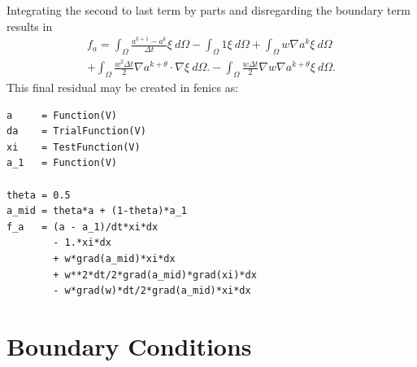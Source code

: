 \documentclass{article}%
\begin{document}
Integrating the second to last term by parts and disregarding the boundary term results in
\begin{align*}
  f_a = \int_{\Omega} \frac{a^{k+1} - a^{k}}{\Delta t}\xi\ d\Omega - 
      \int_{\Omega} 1\xi\ d\Omega
  + \int_{\Omega} w \nabla{a}^k \xi\ d\Omega \\
  + \int_{\Omega} \frac{w^2 \Delta t}{2} 
    \nabla a^{k+\theta} \cdot \nabla \xi\ d\Omega.
  - \int_{\Omega} \frac{w \Delta t}{2} 
    \nabla w \nabla a^{k+\theta} \xi\ d\Omega.
\end{align*}
This final residual may be created in fenics as:

\footnotesize
\begin{verbatim}
a     = Function(V)
da    = TrialFunction(V)
xi    = TestFunction(V)
a_1   = Function(V)

theta = 0.5
a_mid = theta*a + (1-theta)*a_1
f_a   = (a - a_1)/dt*xi*dx 
        - 1.*xi*dx 
        + w*grad(a_mid)*xi*dx 
        + w**2*dt/2*grad(a_mid)*grad(xi)*dx 
        - w*grad(w)*dt/2*grad(a_mid)*xi*dx
\end{verbatim}
\normalsize


\section{Boundary Conditions}
\end{document}
